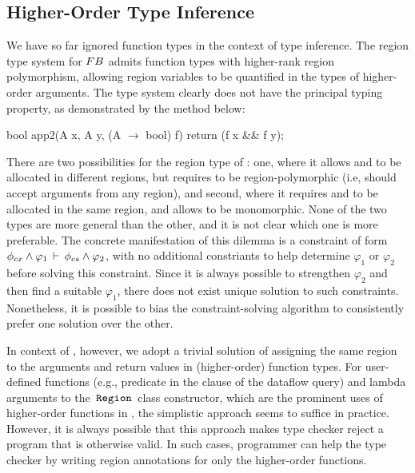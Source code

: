 \subsection{Higher-Order Type Inference}

We have so far ignored function types in the context of type
inference. The region type system for ${\sc FB}$ admits function types with
higher-rank region polymorphism, allowing region variables to be
quantified in the types of higher-order arguments. The type system
clearly does not have the principal typing property, as demonstrated
by the  method below:
\begin{codejava}
bool app2(A x, A y, (A $\rightarrow$ bool) f) 
    { return (f x && f y); }
\end{codejava}
There are two possibilities for the region type of : one,
where it allows  and  to be allocated in different regions,
but requires  to be region-polymorphic (i.e,  should accept
arguments from any region), and second, where it requires  and
 to be allocated in the same region, and allows  to be
monomorphic. None of the two types are more general than the other,
and it is not clear which one is more preferable. The concrete
manifestation of this dilemma is a constraint of form 
$\phi_{cx} \wedge \varphi_1\,\vdash\,\phi_{cs} \wedge \varphi_2$, with
no additional constriants to help determine $\varphi_1$ or $\varphi_2$
before solving this constraint. Since it is always possible to
strengthen $\varphi_2$ and then find a suitable $\varphi_1$, there
does not exist unique solution to such constraints. Nonetheless, it is
possible to bias the constraint-solving algorithm to consistently
prefer one solution over the other.

In context of \name, however, we adopt a trivial solution of
assigning the same region to the arguments and return values in
(higher-order) function types. For user-defined functions (e.g.,
predicate in the  clause of the  dataflow query)
and lambda arguments to the $\,{\tt Region}\,$ class constructor, which are the
prominent uses of higher-order functions in \name, the simplistic
approach seems to suffice in practice. However, it is always possible
that this approach makes type checker reject a program that is
otherwise valid. In such cases, programmer can help the type checker
by writing region annotations for only the higher-order functions.

